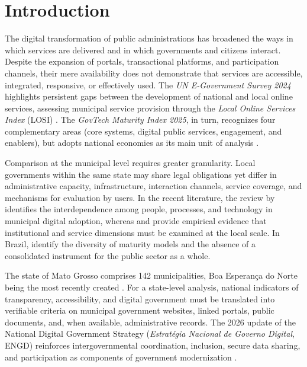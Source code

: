 \documentclass[12pt]{article}
\begin{document}


\section{Introduction}

The digital transformation of public administrations has broadened the ways in which services are delivered and in which governments and citizens interact. Despite the expansion of portals, transactional platforms, and participation channels, their mere availability does not demonstrate that services are accessible, integrated, responsive, or effectively used. The \textit{UN E-Government Survey 2024} highlights persistent gaps between the development of national and local online services, assessing municipal service provision through the \textit{Local Online Services Index} (LOSI) \cite{un2024egovernment}. The \textit{GovTech Maturity Index 2025}, in turn, recognizes four complementary areas (core systems, digital public services, engagement, and enablers), but adopts national economies as its main unit of analysis \cite{worldbank2025gtmi}.

Comparison at the municipal level requires greater granularity. Local governments within the same state may share legal obligations yet differ in administrative capacity, infrastructure, interaction channels, service coverage, and mechanisms for evaluation by users. In the recent literature, the review by \cite{david2023understanding} identifies the interdependence among people, processes, and technology in municipal digital adoption, whereas \cite{toleikiene2025assessing} and \cite{mkhitaryan2026digital} provide empirical evidence that institutional and service dimensions must be examined at the local scale. In Brazil, \cite{vieira2026modelos} identify the diversity of maturity models and the absence of a consolidated instrument for the public sector as a whole.

The state of Mato Grosso comprises 142 municipalities, Boa Esperança do Norte being the most recently created \cite{ibge2025municipios,mt2025ppa}. For a state-level analysis, national indicators of transparency, accessibility, and digital government must be translated into verifiable criteria on municipal government websites, linked portals, public documents, and, when available, administrative records. The 2026 update of the National Digital Government Strategy (\textit{Estratégia Nacional de Governo Digital}, ENGD) reinforces intergovernmental coordination, inclusion, secure data sharing, and participation as components of government modernization \cite{brasil2026portaria5395}.
\end{document}
